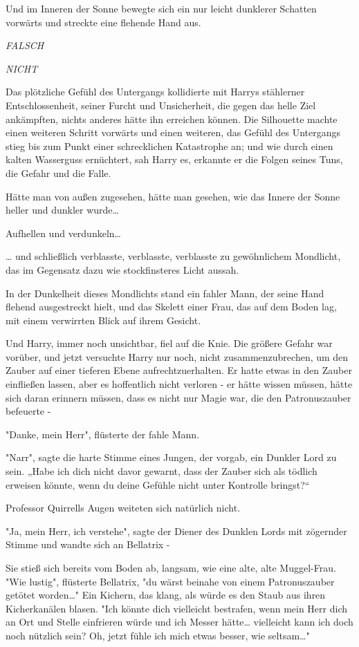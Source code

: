 {Und im Inneren der Sonne bewegte sich ein nur leicht dunklerer Schatten vorwärts und streckte eine flehende Hand aus.

\emph{FALSCH}

\emph{NICHT}

Das plötzliche Gefühl des Untergangs kollidierte mit Harrys stählerner Entschlossenheit, seiner Furcht und Unsicherheit, die gegen das helle Ziel ankämpften, nichts anderes hätte ihn erreichen können. Die Silhouette machte einen weiteren Schritt vorwärts und einen weiteren, das Gefühl des Untergangs stieg bis zum Punkt einer schrecklichen Katastrophe an; und wie durch einen kalten Wasserguss ernüchtert, sah Harry es, erkannte er die Folgen seines Tuns, die Gefahr und die Falle.

Hätte man von außen zugesehen, hätte man gesehen, wie das Innere der Sonne heller und dunkler wurde…

Aufhellen und verdunkeln…

… und schließlich verblasste, verblasste, verblasste zu gewöhnlichem Mondlicht, das im Gegensatz dazu wie stockfinsteres Licht aussah.

In der Dunkelheit dieses Mondlichts stand ein fahler Mann, der seine Hand flehend ausgestreckt hielt, und das Skelett einer Frau, das auf dem Boden lag, mit einem verwirrten Blick auf ihrem Gesicht.

Und Harry, immer noch unsichtbar, fiel auf die Knie. Die größere Gefahr war vorüber, und jetzt versuchte Harry nur noch, nicht zusammenzubrechen, um den Zauber auf einer tieferen Ebene aufrechtzuerhalten. Er hatte etwas in den Zauber einfließen lassen, aber es hoffentlich nicht verloren - er hätte wissen müssen, hätte sich daran erinnern müssen, dass es nicht nur Magie war, die den Patronuszauber befeuerte -

"Danke, mein Herr", flüsterte der fahle Mann.

"Narr", sagte die harte Stimme eines Jungen, der vorgab, ein Dunkler Lord zu sein. „Habe ich dich nicht davor gewarnt, dass der Zauber sich als tödlich erweisen könnte, wenn du deine Gefühle nicht unter Kontrolle bringst?“

Professor Quirrells Augen weiteten sich natürlich nicht.

"Ja, mein Herr, ich verstehe", sagte der Diener des Dunklen Lords mit zögernder Stimme und wandte sich an Bellatrix -

Sie stieß sich bereits vom Boden ab, langsam, wie eine alte, alte Muggel-Frau. "Wie lustig", flüsterte Bellatrix, "du wärst beinahe von einem Patronuszauber getötet worden…" Ein Kichern, das klang, als würde es den Staub aus ihren Kicherkanälen blasen. "Ich könnte dich vielleicht bestrafen, wenn mein Herr dich an Ort und Stelle einfrieren würde und ich Messer hätte… vielleicht kann ich doch noch nützlich sein? Oh, jetzt fühle ich mich etwas besser, wie seltsam…"

}

